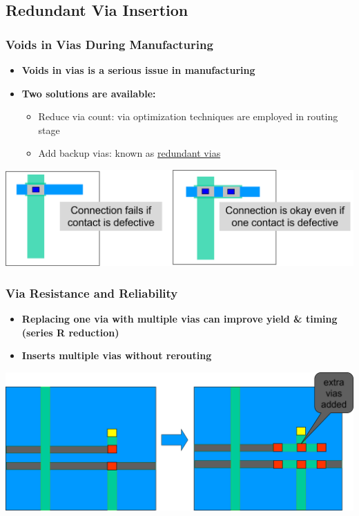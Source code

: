 \documentclass[compress]{beamer}
\begin{document}
\subsection[Via]{Redundant Via Insertion}
\begin{frame}
	\frametitle{Voids in Vias During Manufacturing}
	\begin{itemize}
		\item \textbf{Voids in vias is a serious issue in manufacturing}
		\item \textbf{Two solutions are available:}
		\begin{itemize}
			\item Reduce via count: via optimization techniques are employed in routing stage
			\item Add backup vias: known as \underline{redundant vias}
		\end{itemize}
	\end{itemize}
\begin{center}
	\includegraphics[width=\textwidth]{vias}
\end{center}
\end{frame}
\begin{frame}
	\frametitle{Via Resistance and Reliability}
	\begin{itemize}
		\item \textbf{Replacing one via with multiple vias can improve
		yield \& timing (series R reduction)}
		\item \textbf{Inserts multiple vias without rerouting}
	\end{itemize}
\begin{center}
	\includegraphics[width=\textwidth]{Via}
\end{center}
\end{frame}
\end{document}
